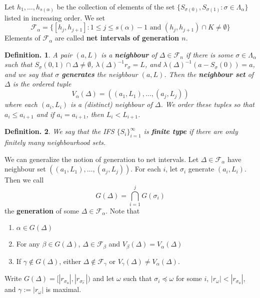 \documentclass[11pt, a4paper]{memoir}
\newcommand{\mbf}[1]{{\boldmath\bfseries #1}}
\theoremstyle{change}
\theoremstyle{plain}
\theoremstyle{nonumberplain}
\newtheorem{definition}{Definition.}
\numberwithin{equation}{section}
\begin{document}
Let $h_1,\ldots,h_{s(\alpha)}$ be the collection of elements of the set $\{S_{\sigma(0)},S_{\sigma(1)}:\sigma\in\Lambda_\alpha\}$ listed in increasing order.
We set
\begin{equation*}
    \mathcal{F}_\alpha=\{[h_j,h_{j+1}]:1\leq j\leq s(\alpha)-1\text{ and }(h_j,h_{j+1})\cap K\neq\emptyset\}
\end{equation*}
Elements of $\mathcal{F}_\alpha$ are called \mbf{net intervals of generation $n$}.
\begin{definition}
    A pair $(a,L)$ is a \textbf{neighbour} of $\Delta\in\mathcal{F}_n$ if there is some $\sigma\in\Lambda_\alpha$ such that $S_\sigma(0,1)\cap\Delta\neq\emptyset$, $\lambda(\Delta)^{-1}r_\sigma=L$, and $\lambda(\Delta)^{-1}(a-S_\sigma(0))=a$, and we say that $\sigma$ \textbf{generates} the neighbour $(a,L)$.
    Then the \textbf{neighbour set} of $\Delta$ is the ordered tuple
    \begin{equation*}
        V_\alpha(\Delta)=((a_1,L_1),\ldots,(a_j,L_j))
    \end{equation*}
    where each $(a_i,L_i)$ is a (distinct) neighbour of $\Delta$.
    We order these tuples so that $a_i\leq a_{i+1}$ and if $a_i=a_{i+1}$, then $L_i<L_{i+1}$.
\end{definition}
\begin{definition}
    We say that the IFS $\{S_i\}_{i=1}^\infty$ is \textbf{finite type} if there are only finitely many neighbourhood sets.
\end{definition}
We can generalize the notion of generation to net intervals.
Let $\Delta\in\mathcal{F}_\alpha$ have neighbour set $((a_1,L_1),\ldots,(a_j,L_j))$.
For each $i$, let $\sigma_i$ generate $(a_i,L_i)$.
Then we call
\begin{equation*}
    G(\Delta)=\bigcap_{i=1}^j G(\sigma_i)
\end{equation*}
the \textbf{generation} of some $\Delta\in\mathcal{F}_\alpha$.
Note that
\begin{enumerate}[nl,r]
    \item $\alpha\in G(\Delta)$
    \item For any $\beta\in G(\Delta)$, $\Delta\in\mathcal{F}_\beta$ and $V_\beta(\Delta)=V_\alpha(\Delta)$
    \item If $\gamma\notin G(\Delta)$, either $\Delta\notin\mathcal{F}_\gamma$ or $V_\gamma(\Delta)\neq V_\alpha(\Delta)$.
\end{enumerate}
Write $G(\Delta)=[|r_{\sigma_u}|,|r_{\sigma_v^-}|)$ and let $\omega$ such that $\sigma_i\preccurlyeq\omega$ for some $i$, $|r_\omega|<|r_{\sigma_u}|$, and $\gamma:=|r_\omega|$ is maximal.
\end{document}
